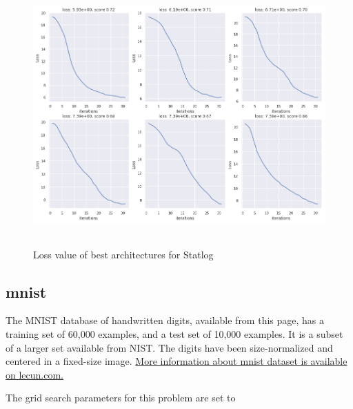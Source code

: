\documentclass[10pt]{SelfArx} %
\begin{document}
\begin{figure}\centering
	\includegraphics[width=1.79\columnwidth, height=10cm]{img/statlog-plots1}
	\caption{Loss value of best architectures for Statlog}
	\label{fsatlog}
\end{figure}

\subsection{mnist}
The MNIST database of handwritten digits, available from this page, has a training set of 60,000 examples, and a test set of 10,000 examples. It is a subset of a larger set available from NIST. The digits have been size-normalized and centered in a fixed-size image. \href{http://yann.lecun.com/exdb/mnist/}{More information about mnist dataset is available on lecun.com.}

The grid search parameters for this problem are set to
\end{document}
